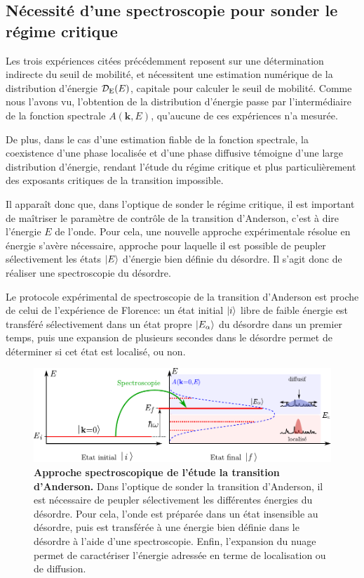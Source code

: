 \subsection{Nécessité d'une spectroscopie pour sonder le régime critique}
Les trois expériences citées précédemment reposent sur une détermination indirecte du seuil de mobilité, et nécessitent une estimation numérique de la distribution d'énergie $\mathcal{D}_{\mathrm{E}}(E)$, capitale pour calculer le seuil de mobilité. Comme nous l'avons vu, l'obtention de la distribution d'énergie passe par l'intermédiaire de la fonction spectrale $A(\mathbf{k},E)$, qu'aucune de ces expériences n'a mesurée. 

De plus, dans le cas d'une estimation fiable de la fonction spectrale, la coexistence d'une phase localisée et d'une phase diffusive témoigne d'une large distribution d'énergie, rendant l'étude du régime critique et plus particulièrement des exposants critiques de la transition impossible.

Il apparaît donc que, dans l'optique de sonder le régime critique, il est important de maîtriser le paramètre de contrôle de la transition d'Anderson, c'est à dire l'énergie $E$ de l'onde. Pour cela, une nouvelle approche expérimentale résolue en énergie s'avère nécessaire, approche pour laquelle il est possible de peupler sélectivement les états $\left| E \right\rangle$ d'énergie bien définie du désordre. Il s'agit donc de réaliser une spectroscopie du désordre.





Le protocole expérimental de spectroscopie de la transition d'Anderson est proche de celui de l'expérience de Florence: un état initial $\left| i \right\rangle$ libre de faible énergie est transféré sélectivement dans un état propre $\left| E_\alpha \right\rangle$ du désordre dans un premier temps, puis une expansion de plusieurs secondes dans le désordre permet de déterminer si cet état est localisé, ou non. 




\begin{figure}
\centering
\includegraphics[width=\textwidth]{Fig/Localisation/spectroscopie_anderson.pdf}
\caption{\textbf{Approche spectroscopique de l'étude la transition d'Anderson.} Dans l'optique de sonder la transition d'Anderson, il est nécessaire de peupler sélectivement les différentes énergies du désordre. Pour cela, l'onde est préparée dans un état insensible au désordre, puis est transférée à une énergie bien définie dans le désordre à l'aide d'une spectroscopie. Enfin, l'expansion du nuage permet de caractériser l'énergie adressée en terme de localisation ou de diffusion.}
\label{fig:spectroscopie_anderson}
\end{figure}


